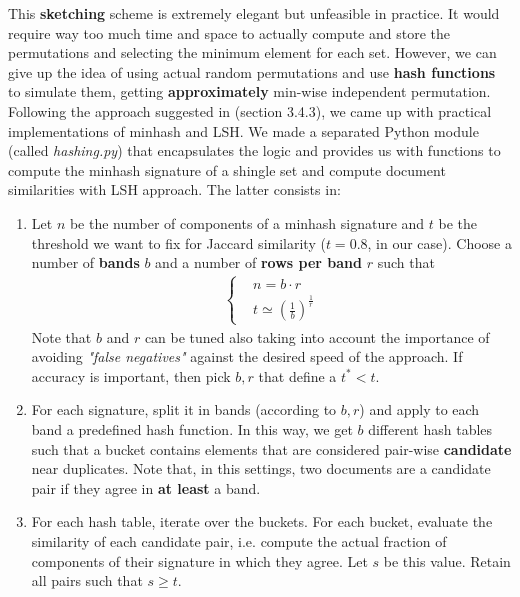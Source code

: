 \noindent This \textbf{sketching} scheme is extremely elegant but unfeasible in practice. It would require way too much time and space to actually compute and store the permutations and selecting the minimum element for each set. However, we can give up the idea of using actual random permutations and use \textbf{hash functions} to simulate them, getting \textbf{approximately} min-wise independent permutation.\\
Following the approach suggested in \cite{mmd} (section 3.4.3), we came up with practical implementations of minhash and LSH. We made a separated Python module (called \textit{hashing.py}) that encapsulates the logic and provides us with functions to compute the minhash signature of a shingle set and compute document similarities with LSH approach. The latter consists in:
\begin{enumerate}
\item 
Let $n$ be the number of components of a minhash signature and $t$ be the threshold we want to fix for Jaccard similarity ($t = 0.8$, in our case). 
Choose a number of \textbf{bands} $b$ and a number of \textbf{rows per band} $r$ such that
\begin{align*}
\left\{ 
\begin{aligned}
  &n = b \cdot r\\
  &t \simeq \left(\frac{1}{b}\right)^{\frac{1}{r}}
\end{aligned}
\right.
\end{align*}
Note that $b$ and $r$ can be tuned also taking into account the importance of avoiding \textit{"false negatives"} against the desired speed of the approach. If accuracy is important, then pick $b,r$ that define a $t^* < t$.

\item
For each signature, split it in bands (according to $b,r$) and apply to each band a predefined hash function. In this way, we get $b$ different hash tables such that a bucket contains elements that are considered pair-wise \textbf{candidate} near duplicates. Note that, in this settings, two documents are a candidate pair if they agree in \textbf{at least} a band.

\item
For each hash table, iterate over the buckets. For each bucket, evaluate the similarity of each candidate pair, i.e. compute the actual fraction of components of their signature in which they agree. Let $s$ be this value. Retain all pairs such that $s \ge t$.
\end{enumerate}

